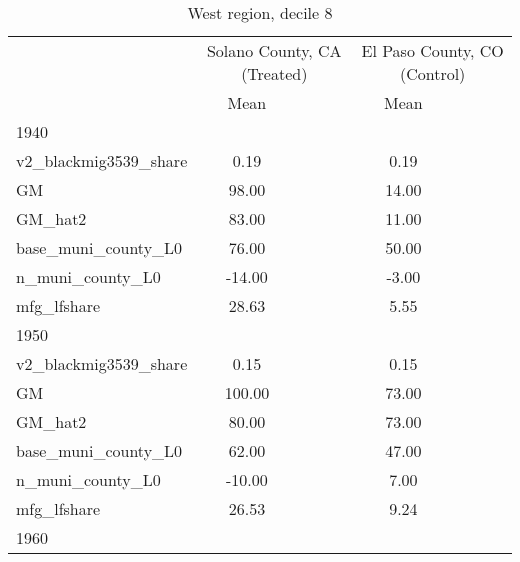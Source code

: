 \begin{table}[htbp]\centering
\def\sym#1{\ifmmode^{#1}\else\(^{#1}\)\fi}
\caption{West region, decile 8 \label{tab1}}
\begin{tabular}{l*{2}{ccc}}
\toprule
                    &\multicolumn{3}{c}{Solano County, CA (Treated)}&\multicolumn{3}{c}{El Paso County, CO (Control)}\\
                    &        Mean&            &            &        Mean&            &            \\
\midrule
1940                &            &            &            &            &            &            \\
v2\_blackmig3539\_share&        0.19&            &            &        0.19&            &            \\
GM                  &       98.00&            &            &       14.00&            &            \\
GM\_hat2             &       83.00&            &            &       11.00&            &            \\
base\_muni\_county\_L0 &       76.00&            &            &       50.00&            &            \\
n\_muni\_county\_L0    &      -14.00&            &            &       -3.00&            &            \\
mfg\_lfshare         &       28.63&            &            &        5.55&            &            \\
\midrule
1950                &            &            &            &            &            &            \\
v2\_blackmig3539\_share&        0.15&            &            &        0.15&            &            \\
GM                  &      100.00&            &            &       73.00&            &            \\
GM\_hat2             &       80.00&            &            &       73.00&            &            \\
base\_muni\_county\_L0 &       62.00&            &            &       47.00&            &            \\
n\_muni\_county\_L0    &      -10.00&            &            &        7.00&            &            \\
mfg\_lfshare         &       26.53&            &            &        9.24&            &            \\
\midrule
1960                &            &            &            &            &            &            \\

\end{tabular}
\end{table}
